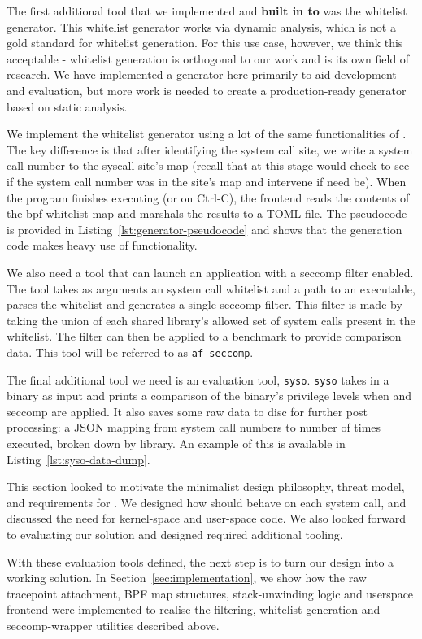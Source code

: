 The first additional tool that we implemented and \textbf{built in to \af} was
the whitelist generator. This whitelist generator works via dynamic analysis,
which is not a gold standard for whitelist generation. For this use case,
however, we think this acceptable - whitelist generation is orthogonal to our
work and is its own field of research. We have implemented a generator here
primarily to aid development and evaluation, but more work is needed to create a
production-ready generator based on static analysis.

We implement the whitelist generator using a lot of the same functionalities of
\af. The key difference is that after identifying the system call site, we write a
system call number to the syscall site's map (recall that at this stage \af would
check to see if the system call number was in the site's map and intervene if need
be). When the program finishes executing (or on Ctrl-C), the frontend reads the
contents of the bpf whitelist map and marshals the results to a TOML file.
The pseudocode is provided in Listing~\ref{lst:generator-pseudocode} and shows
that the generation code makes heavy use of \afg functionality.

We also need a tool that can launch an application with a seccomp filter enabled.
The tool takes as arguments an \af system call whitelist
and a path to an executable, parses the whitelist and generates a single
seccomp filter. This filter is made by taking the union of each shared 
library's allowed set of system calls present in the \af whitelist. The filter can
then be applied to a benchmark to provide comparison data. This tool will be
referred to as \texttt{af-seccomp}.

The final additional tool we need is an evaluation tool, \texttt{syso}.
\texttt{syso} takes in a binary as input and prints a comparison of the 
binary's privilege levels  when \af and seccomp are applied. It also saves
some raw data to disc for further post processing: a JSON mapping from
system call numbers to number of times executed, broken down by library. An
example of this is available in Listing~\ref{lst:syso-data-dump}.

This section looked to motivate the minimalist design philosophy, threat model,
and requirements for \af. We designed how \af should behave on each system call,
and discussed the need for kernel-space and user-space code. We also looked
forward to evaluating our solution and designed required additional tooling.

With these evaluation tools defined, the next step is to turn our design into a
working solution. In Section \ref{sec:implementation}, we show how the raw 
tracepoint attachment, BPF map structures, stack-unwinding logic and userspace 
frontend were implemented to realise the filtering, whitelist generation and 
seccomp-wrapper utilities described above.
